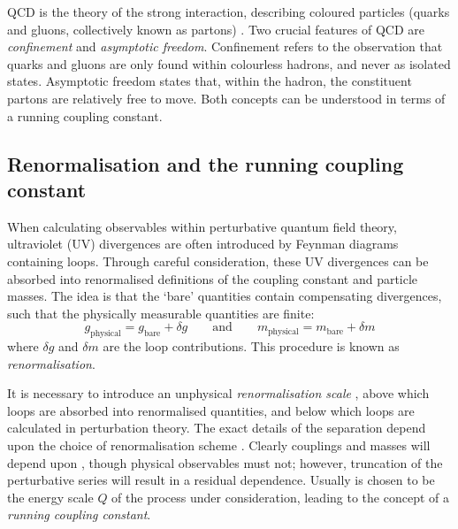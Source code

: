 
QCD is the theory of the strong interaction, describing coloured particles (quarks 
and gluons, collectively known as partons) \cite{Ellis:1996}. Two crucial features of 
QCD are \textit{confinement} and \textit{asymptotic freedom}. Confinement refers to 
the observation that quarks and gluons are only found within colourless hadrons, and 
never as isolated states. Asymptotic freedom states that, within the hadron, the 
constituent partons are relatively free to move. Both concepts can be understood in terms 
of a running coupling constant.



\subsection{Renormalisation and the running coupling constant}
\label{sec:qcd:renormalisation}

When calculating observables within perturbative quantum field theory, ultraviolet (UV) 
divergences are often introduced by Feynman diagrams containing loops. Through careful 
consideration, these UV divergences can be absorbed into renormalised definitions of the 
coupling constant and particle masses. The idea is that the `bare' quantities contain 
compensating divergences, such that the physically measurable quantities are finite:
\begin{equation}
	g_{\text{physical}} = g_{\text{bare}} + \delta g
	\quad\quad\text{and}\quad\quad
	m_{\text{physical}} = m_{\text{bare}} + \delta m
\end{equation}
where $\delta g$ and $\delta m$ are the loop contributions. This procedure is known as 
\textit{renormalisation}.

It is necessary to introduce an unphysical \textit{renormalisation scale} \mur, above 
which loops are absorbed into renormalised quantities, and below which loops are 
calculated in perturbation theory. The exact details of the separation depend upon the 
choice of renormalisation scheme \cite{Aitchison}. Clearly couplings and masses will 
depend upon \mur, though physical observables must not; however, truncation of the 
perturbative series will result in a residual \mur dependence. Usually \mur is chosen to 
be the energy scale $Q$ of the process under consideration, leading to the concept of a 
\textit{running coupling constant}.


